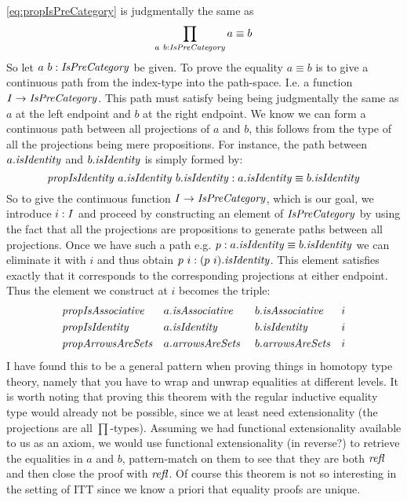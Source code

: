 \ref{eq:propIsPreCategory} is judgmentally the same as
%
$$
\prod_{a\ b \tp \IsPreCategory} a \equiv b
$$
%
So let $a\ b \tp \IsPreCategory$ be given. To prove the equality $a \equiv b$ is
to give a continuous path from the index-type into the path-space. I.e. a
function $I \to \IsPreCategory$. This path must satisfy being being judgmentally
the same as $a$ at the left endpoint and $b$ at the right endpoint. We know we
can form a continuous path between all projections of $a$ and $b$, this follows
from the type of all the projections being mere propositions. For instance, the
path between $a.\isIdentity$ and $b.\isIdentity$ is simply formed by:
%
$$
\propIsIdentity\ a.\isIdentity\ b.\isIdentity
\tp
a.\isIdentity \equiv b.\isIdentity
$$
%
So to give the continuous function $I \to \IsPreCategory$, which is our goal, we
introduce $i \mathrel{:} I$ and proceed by constructing an element of $\IsPreCategory$
by using the fact that all the projections are propositions to generate paths
between all projections. Once we have such a path e.g. $p \tp a.\isIdentity
\equiv b.\isIdentity$ we can eliminate it with $i$ and thus obtain $p\ i \tp
(p\ i).\isIdentity$. This element satisfies exactly that it corresponds to the
corresponding projections at either endpoint. Thus the element we construct at
$i$ becomes the triple:
%
\begin{equation}
\label{eq:proof-prop-IsPreCategory}
\begin{aligned}
  & \var{propIsAssociative} && a.\var{isAssociative}\
       && b.\var{isAssociative} && i  \\
  & \propIsIdentity    && a.\isIdentity\
       && b.\isIdentity    && i  \\
  & \var{propArrowsAreSets} && a.\var{arrowsAreSets}\
       && b.\var{arrowsAreSets} && i
\end{aligned}
\end{equation}
%
I have found this to be a general pattern when proving things in homotopy type
theory, namely that you have to wrap and unwrap equalities at different levels.
It is worth noting that proving this theorem with the regular inductive equality
type would already not be possible, since we at least need extensionality (the
projections are all $\prod$-types). Assuming we had functional extensionality
available to us as an axiom, we would use functional extensionality (in
reverse?) to retrieve the equalities in $a$ and $b$, pattern-match on them to
see that they are both $\refl$ and then close the proof with $\refl$.
Of course this theorem is not so interesting in the setting of ITT since we know
a priori that equality proofs are unique.

